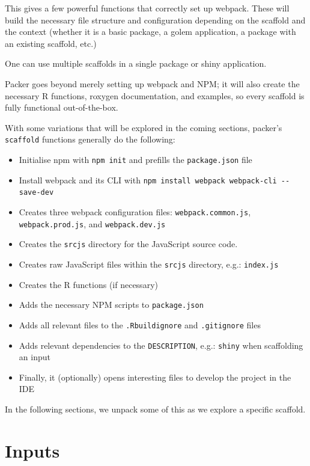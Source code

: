 \documentclass[
]{krantz}
\makeatletter
\providecommand{\tightlist}{%
  \setlength{\itemsep}{0pt}\setlength{\parskip}{0pt}}
\newenvironment{kframe}{%
\medskip{}
\setlength{\fboxsep}{.8em}
 \def\at@end@of@kframe{}%
 \ifinner\ifhmode%
  \def\at@end@of@kframe{\end{minipage}}%
  \begin{minipage}{\columnwidth}%
 \fi\fi%
 \def\FrameCommand##1{\hskip\@totalleftmargin \hskip-\fboxsep
 \colorbox{shadecolor}{##1}\hskip-\fboxsep
     \hskip-\linewidth \hskip-\@totalleftmargin \hskip\columnwidth}%
 \MakeFramed {\advance\hsize-\width
   \@totalleftmargin\z@ \linewidth\hsize
   \@setminipage}}%
 {\par\unskip\endMakeFramed%
 \at@end@of@kframe}
\newenvironment{rmdblock}[1]
  {
  \begin{itemize}
  \renewcommand{\labelitemi}{
    \raisebox{-.7\height}[0pt][0pt]{
      {\setkeys{Gin}{width=3em,keepaspectratio}\texttt{[image: images/\#1]}}
    }
  }
  \setlength{\fboxsep}{1em}
  \begin{kframe}
  \item
  }
  {
  \end{kframe}
  \end{itemize}
  }
\newenvironment{rmdnote}
  {\begin{rmdblock}{note}}
  {\end{rmdblock}}
\makeatother
\begin{document}
This gives a few powerful functions that correctly set up webpack. These will build the necessary file structure and configuration depending on the scaffold and the context (whether it is a basic package, a golem application, a package with an existing scaffold, etc.)

\begin{rmdnote}
One can use multiple scaffolds in a single package or shiny application.
\end{rmdnote}

Packer goes beyond merely setting up webpack and NPM; it will also create the necessary R functions, roxygen documentation, and examples, so every scaffold is fully functional out-of-the-box.

With some variations that will be explored in the coming sections, packer's \texttt{scaffold} functions generally do the following:

\begin{itemize}
\tightlist
\item
  Initialise npm with \texttt{npm\ init} and prefills the \texttt{package.json} file
\item
  Install webpack and its CLI with \texttt{npm\ install\ webpack\ webpack-cli\ -\/-save-dev}
\item
  Creates three webpack configuration files: \texttt{webpack.common.js}, \texttt{webpack.prod.js}, and \texttt{webpack.dev.js}
\item
  Creates the \texttt{srcjs} directory for the JavaScript source code.
\item
  Creates raw JavaScript files within the \texttt{srcjs} directory, e.g.: \texttt{index.js}
\item
  Creates the R functions (if necessary)
\item
  Adds the necessary NPM scripts to \texttt{package.json}
\item
  Adds all relevant files to the \texttt{.Rbuildignore} and \texttt{.gitignore} files
\item
  Adds relevant dependencies to the \texttt{DESCRIPTION}, e.g.: \texttt{shiny} when scaffolding an input
\item
  Finally, it (optionally) opens interesting files to develop the project in the IDE
\end{itemize}

In the following sections, we unpack some of this as we explore a specific scaffold.

\hypertarget{packer-inputs}{%
\section{Inputs}\label{packer-inputs}}
\end{document}
